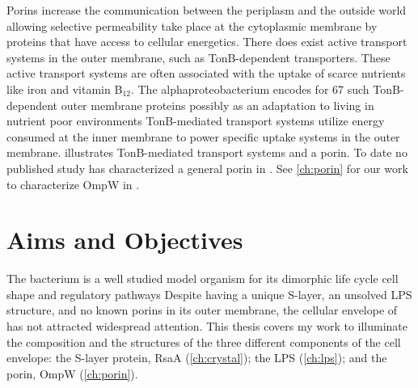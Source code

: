 Porins increase the communication between the periplasm and the outside world allowing selective permeability take place at the cytoplasmic membrane by proteins that have access to
cellular energetics. There does exist active transport systems in the outer membrane, such as TonB-dependent transporters. These active transport systems are often associated with
the uptake of scarce nutrients like iron and vitamin B$_{12}$. The
alphaproteobacterium \caulobacter{} encodes for 67 such TonB-dependent outer
membrane proteins
possibly as an adaptation to living in nutrient poor
environments TonB-mediated transport systems
utilize energy consumed at the inner membrane to power specific uptake systems
in the outer membrane.  illustrates TonB-mediated
transport systems and a porin. To date no published study has characterized a
general porin in \caulobacter{}. See 
\cref{ch:porin} for our work to characterize OmpW in \caulobacter{}.

 \section{Aims and Objectives}\label{sec:summary} The bacterium \caulobacter is a well studied model organism for its dimorphic life cycle cell
shape and regulatory pathways Despite having a unique \ac{S-layer}, an unsolved \ac{LPS} structure, and no known porins in
its outer membrane, the cellular envelope of \caulobacter has not attracted
widespread attention. This thesis covers my work to illuminate the composition and the structures of the
three different components of the \caulobacter cell envelope: the \ac{S-layer} protein, RsaA (\cref{ch:crystal}); the \ac{LPS} (\cref{ch:lps}); and the porin, OmpW
(\cref{ch:porin}).


